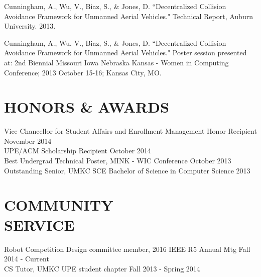 \documentclass[line,margin]{res}
\begin{document}
\begin{resume}
\hangindent=0.7cm Cunningham, A., Wu, V., Biaz, S., \& Jones, D. ``Decentralized Collision Avoidance Framework for Unmanned Aerial Vehicles." Technical Report, Auburn University. 2013.

\hangindent=0.7cm Cunningham, A., Wu, V., Biaz, S., \& Jones, D. ``Decentralized Collision Avoidance Framework for Unmanned Aerial Vehicles." Poster session presented at: 2nd Biennial Missouri Iowa Nebraska Kansas - Women in Computing Conference; 2013 October 15-16; Kansas City, MO.
		

\section{HONORS \& AWARDS}
		Vice Chancellor for Student Affairs and Enrollment Management Honor Recipient \hfill November 2014\\
		UPE/ACM Scholarship Recipient \hfill October 2014 \\
		Best Undergrad Technical Poster, MINK - WIC Conference \hfill October 2013	\\
		Outstanding Senior, UMKC SCE Bachelor of Science in Computer Science \hfill 2013
\section{COMMUNITY \\ SERVICE}  
		Robot Competition Design committee member, 2016 IEEE R5 Annual Mtg \hfill Fall 2014 - Current \\  
            	CS Tutor, UMKC UPE student chapter  \hfill Fall 2013 - Spring 2014 
\end{resume}
\end{document}
